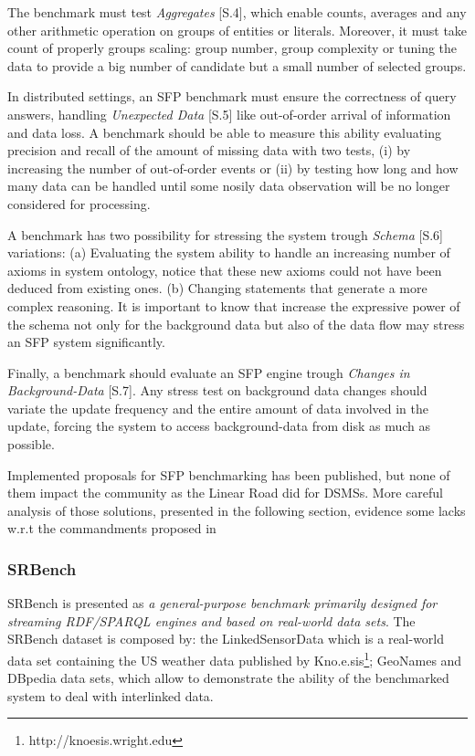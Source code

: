 The benchmark must test \textit{Aggregates} [S.4], which enable counts, averages and any other arithmetic operation on groups of entities or literals. Moreover, it must take count of properly groups scaling: group number, group complexity or tuning the data to provide a big number of candidate but a small number of selected groups.

In distributed settings, an SFP benchmark must ensure the correctness of query answers, handling \textit{Unexpected Data} [S.5] like out-of-order arrival of information and data loss. A benchmark should be able to measure this ability evaluating precision and recall of the amount of missing data with two tests, (i) by increasing the number of out-of-order events or (ii) by testing how long and how many data can be handled until some nosily data observation will be no longer considered for processing.

A benchmark has two possibility for stressing the system trough \textit{Schema} [S.6] variations: (a) Evaluating the system ability to handle an increasing number of axioms in system ontology, notice that these new axioms could not have been deduced from existing ones. (b) Changing statements that generate a more complex reasoning. It is important to know that increase the expressive power of the schema not only for the background data but also of the data flow may stress an SFP system significantly.

Finally, a benchmark should evaluate an SFP engine trough \textit{Changes in Background-Data} [S.7]. Any stress test on background data changes should variate the update frequency and the entire amount of data involved in the update, forcing the system to access background-data from disk as much as possible.

Implemented proposals for SFP benchmarking has been published, but none of them impact the community as the Linear Road did for DSMSs. More careful analysis of those solutions, presented in the following section, evidence some lacks w.r.t the commandments proposed in \cite{DBLP:conf/esws/ScharrenbachUMVB13} 

\subsubsection{SRBench}\label{sec:srbench}

SRBench is presented as \textit{a general-purpose benchmark primarily designed for streaming RDF/SPARQL engines and based on real-world data sets}\cite{Zhang2012}. The SRBench dataset is composed by: the LinkedSensorData  which  is a real-world data set containing the US weather data published by Kno.e.sis\footnote{ http://knoesis.wright.edu};  GeoNames and DBpedia data sets, which allow to demonstrate the ability of the benchmarked system to deal with interlinked data.

